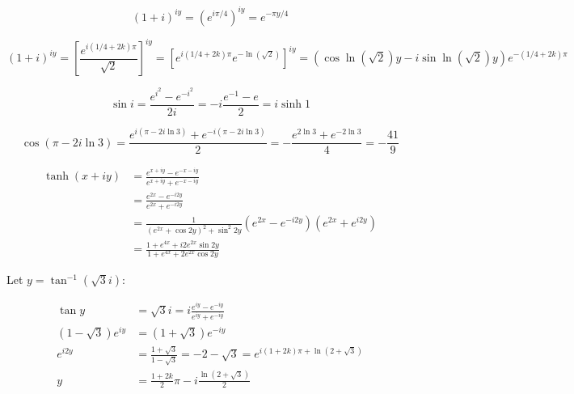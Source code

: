 \documentclass[12pt]{article}
\begin{document}

\begin{equation}
    (1 + i)^{iy} = \left( e^{i\pi/4} \right)^{iy} = e^{-\pi y/4}
\end{equation}

\begin{correction}
    \begin{equation*}
        (1 + i)^{iy} = \left[ \frac{e^{i(1/4 + 2k)\pi}}{\sqrt{2}} \right]^{iy} = \left[ e^{i(1/4 + 2k)\pi} e^{-\ln{(\sqrt{2})}} \right]^{iy} = \left( \cos{\ln{(\sqrt{2})}y} - i \sin{\ln{(\sqrt{2})}y} \right) e^{-(1/4 + 2k)\pi}
    \end{equation*}
\end{correction}


\begin{equation}
    \sin{i} = \frac{e^{i^{2}} - e^{-i^{2}}}{2i} = -i\frac{e^{-1} - e}{2} = i \sinh{1}
\end{equation}


\begin{equation}
    \cos{(\pi - 2i \ln{3})} = \frac{e^{i(\pi - 2i \ln{3})} + e^{-i(\pi - 2i \ln{3})}}{2} = -\frac{e^{2\ln{3}} + e^{-2\ln{3}}}{4} = -\frac{41}{9}
\end{equation}


\begin{equation}
    \begin{split}
        \tanh{(x + iy)} &= \frac{e^{x + iy} - e^{-x - iy}}{e^{x + iy} + e^{-x - iy}} \\
        &= \frac{e^{2x} - e^{-i2y}}{e^{2x} + e^{-i2y}} \\
        &= \frac{1}{(e^{2x} + \cos{2y})^{2} + \sin^{2}{2y}} (e^{2x} - e^{-i2y})(e^{2x} + e^{i2y}) \\
        &= \frac{1 + e^{4x} + i2e^{2x} \sin{2y}}{1 + e^{4x} + 2e^{2x} \cos{2y}}
    \end{split}
\end{equation}

Let $y = \tan^{-1}{(\sqrt{3}i)}$:

\begin{equation}
    \begin{split}
        \tan{y} &= \sqrt{3}i = i\frac{e^{iy} - e^{-iy}}{e^{iy} + e^{-iy}} \\
        (1 - \sqrt{3})e^{iy} &= (1 + \sqrt{3})e^{-iy} \\
        e^{i2y} &= \frac{1 + \sqrt{3}}{1 - \sqrt{3}} = -2 - \sqrt{3} = e^{i(1 + 2k)\pi + \ln{(2 + \sqrt{3})}}\\
        y &= \frac{1 + 2k}{2} \pi - i \frac{\ln{(2 + \sqrt{3})}}{2}
    \end{split}
\end{equation}
\end{document}
